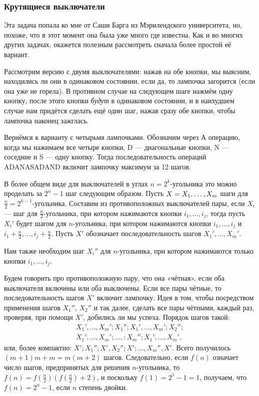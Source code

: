 \subsubsection*{Крутящиеся выключатели}%

Эта задача попала ко мне от Саши Барга из Мэрилендского университета, но, похоже, что в этот момент она была уже много где известна.
Как и во многих других задачах, окажется полезным рассмотреть сначала более простой её вариант.

\medskip

Рассмотрим версию с двумя выключателями: нажав на обе кнопки, мы выясним, находились ли они в одинаковом состоянии, если да, то лампочка загорится (если она уже не горела).
В противном случае на следующем шаге нажмём одну кнопку, после этого кнопки \emph{будут} в одинаковом состоянии, и в наихудшем случае нам придётся сделать ещё один шаг, нажав сразу обе кнопки, чтобы лампочка наконец зажглась.

Вернёмся к варианту с четырьмя лампочками.
Обозначим через 
А операцию, когда мы нажимаем все четыре кнопки, 
D --- диагональные кнопки, 
N --- соседние и 
S --- одну кнопку.
Тогда последовательность операций ADANASADAND включит лампочку максимум за 12 шагов.

В более общем виде для выключателей в углах $n=2^k$-угольника это можно проделать за $2^{n}-1$ шаг следующим образом.
Пусть $X\z=X_1,\dots,X_m$ шаги для $\tfrac n2=2^{k-1}$-угольника.
Составим из противоположных выключателей пары, если $X_i$ --- шаг для $\tfrac n2$-угольника, при котором нажимаются кнопки $i_1,\dots,i_j$, тогда пусть $X_i'$ будет шагом для $n$-угольника, при котором нажимаются кнопки $i_1,\dots,i_j$ и $i_1+\tfrac n2,\dots,i_j+\tfrac n2$.
Пусть $X'$ обозначает последовательность шагов $X_1',\dots,X_m'$.

Нам также необходим шаг $X_i''$ для $n$-угольника, при котором нажимаются только кнопки $i_1,\dots,i_j$.

Будем говорить про противоположную пару, что она «чётная», если оба выключателя включены или оба выключены.
Если все пары чётные, то последовательность шагов $X'$ включит лампочку.
Идея в том, чтобы посредством применения шагов $X_1''$, $X_2''$ и так далее, сделать все пары чётными, каждый раз, проверяя, при помощи $X'$, добились ли мы успеха.
Порядок шагов такой:
\begin{align*}
X_1',\dots,X_m';X_1'';X_1',\dots,X_m';X_2'';
\\
X_1',\dots,X_m';\dots,:X_m'';X_1',\dots,X_m',
\end{align*}
или, более компактно: $X';X_1'';X',X_2'';X';\dots,X_m'',X'$.
Всего получилось $(m+1)m+m=m(m+2)$ шагов.
Следовательно, если $f(n)$ означает число шагов, предпринятых для решения $n$-угольника, то 
$f(n)=f(\tfrac n2)(f(\tfrac n2)+2)$,
и поскольку $f(1)=2^1-1=1$, получаем, что $f(n)=2^n-1$, если $n$ степень двойки.

